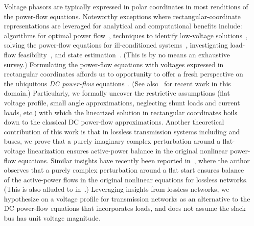 \documentclass[10 pt, conference]{ieeeconf}
\begin{document}
Voltage phasors are typically expressed in polar coordinates in most renditions of the power-flow equations. Noteworthy exceptions where rectangular-coordinate representations are leveraged for analytical and computational benefits include: algorithms for optimal power flow~\cite{Torres96optimalpower,Costa-1999,Zhang-2005}, techniques to identify low-voltage solutions~\cite{Overbye-1996}, solving the power-flow equations for ill-conditioned systems~\cite{Iwamoto-1981}, investigating load-flow feasibility~\cite{Makarov-2000}, and state estimation~\cite{Rao-1983,Keyhani-1985}. (This is by no means an exhaustive survey.) Formulating the power-flow equations with voltages expressed in rectangular coordinates affords us to opportunity to offer a fresh perspective on the ubiquitous \emph{DC power-flow} equations~\cite{Wood:1996}. (See also~\cite{Dorfler-DCPowerFlow-2013,Stott-2009} for recent work in this domain.) Particularly, we formally uncover the restrictive assumptions (flat voltage profile, small angle approximations, neglecting shunt loads and current loads, etc.) with which the linearized solution in rectangular coordinates boils down to the classical DC power-flow approximations. Another theoretical contribution of this work is that in lossless transmission systems including  and  buses, we prove that a purely imaginary complex perturbation around a flat-voltage linearization ensures active-power balance in the original nonlinear power-flow equations. Similar insights have recently been reported in~\cite{Ross-2013}, where the author observes that a purely complex perturbation around a flat start ensures balance of the active-power flows in the original nonlinear equations for lossless networks. (This is also alluded to in~\cite{Baosen-2013}.) Leveraging insights from lossless networks, we hypothesize on a voltage profile for transmission networks as an alternative to the DC power-flow equations that incorporates  loads, and does not assume the slack bus has unit voltage magnitude.
\end{document}
